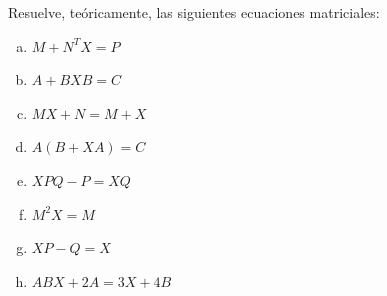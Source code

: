 \begin{ejre}
Resuelve, teóricamente, las siguientes ecuaciones matriciales:
\begin{multicols}{2}
\begin{enumerate}[a) ]
\item $M+N^TX=P$
\item $A+BXB=C$
\item $MX+N=M+X$
\item $A(B+XA)=C$
\item $XPQ-P=XQ$
\item $M^2X=M$
\item $XP-Q=X$
\item $ABX+2A=3X+4B$	
\end{enumerate}
\end{multicols}

\end{ejre}

